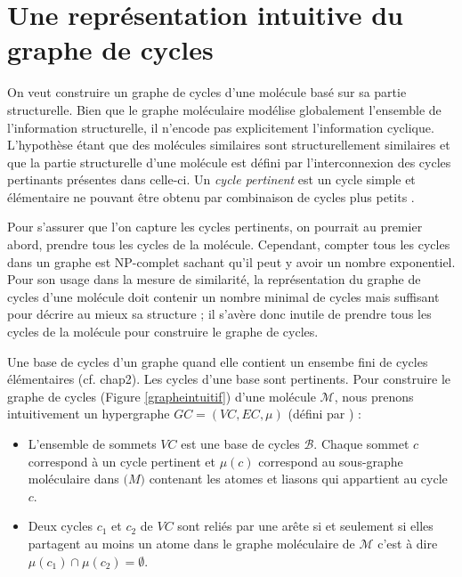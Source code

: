 \section{Une représentation intuitive du graphe de cycles }
\label{intuition}


On veut construire un graphe de cycles d'une molécule basé sur sa partie structurelle. Bien que le graphe moléculaire modélise globalement l'ensemble de l'information structurelle, il n'encode pas explicitement l'information cyclique. L'hypothèse étant que des molécules similaires sont structurellement similaires et que la partie structurelle d'une molécule est défini par l'interconnexion des cycles pertinants présentes dans celle-ci. 
Un \textit{cycle pertinent} est un cycle simple et élémentaire ne pouvant être obtenu par combinaison de cycles plus petits \cite{vismara}. 

Pour s'assurer que l'on capture les cycles pertinents, on pourrait au premier abord, prendre tous les cycles de la molécule. Cependant, compter tous les cycles dans un graphe est NP-complet sachant qu'il peut y avoir un nombre exponentiel. Pour son usage dans la mesure de similarité, la représentation du graphe de cycles  d'une molécule doit contenir un nombre minimal de cycles mais suffisant pour décrire au mieux sa structure ; il s'avère donc inutile de prendre tous les cycles de la molécule pour construire le graphe de cycles.

Une base de cycles d'un graphe quand elle contient un ensembe fini de cycles élémentaires (cf. chap2). Les cycles d'une base sont pertinents. Pour construire le graphe de cycles (Figure \ref{grapheintuitif}) d'une molécule $\mathcal{M}$, nous prenons intuitivement un hypergraphe $GC = (VC,EC,\mu)$ (défini par \cite{benoit}) :
\begin{itemize}
\item L'ensemble de sommets $VC$ est une base de cycles $ \mathcal{B}$. Chaque sommet $c$ correspond à un cycle pertinent et $\mu(c)$ correspond au sous-graphe moléculaire dans $\mathcal(M)$ contenant les atomes et liasons qui appartient au cycle $c$.
\item Deux cycles $c_1$ et $c_2$  de $VC$ sont reliés par une arête si et seulement si elles partagent au moins un atome dans le graphe moléculaire de $\mathcal{M}$ c'est à dire $\mu(c_1) \cap \mu(c_2) = \emptyset$. 
\end{itemize}  

